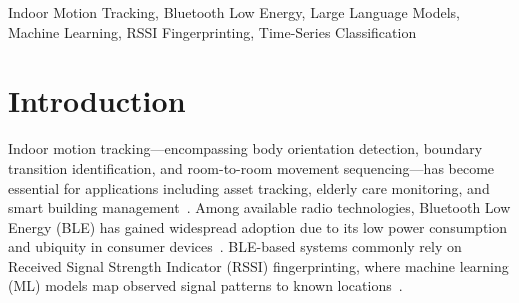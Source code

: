 \documentclass[conference]{IEEEtran}
\begin{document}
\maketitle
\vspace{-12mm}

\begin{abstract}
This paper presents a comparative evaluation of Bluetooth Low Energy (BLE) Received Signal Strength Indicator (RSSI)-based indoor motion tracking using four classifiers: K-Nearest Neighbors (KNN), eXtreme Gradient Boosting (XGBoost), and two zero-shot Large Language Model (LLM) classifiers (Claude Opus 4.6 and Gemini 3.1 Pro). Experiments are conducted in a single room divided into four zones by cloth partitions, instrumented with four ESP32-S3 BLE anchor nodes and one M5StickC Plus2 wearable tag. Three scenarios evaluate body orientation detection, boundary transition classification, and multi-zone trajectory sequencing under inherently unstable BLE signal conditions. Robustness experiments under noise injection and anchor failure reveal that LLMs demonstrate strong resilience to hardware degradation. These findings suggest that zero-shot LLMs can achieve competitive performance compared to trained ML models on structured BLE RSSI classification tasks, particularly when temporal reasoning or clear signal patterns are present.
\end{abstract}

\begin{IEEEkeywords}
Indoor Motion Tracking, Bluetooth Low Energy, Large Language Models, Machine Learning, RSSI Fingerprinting, Time-Series Classification
\end{IEEEkeywords}


\section{Introduction}
Indoor motion tracking---encompassing body orientation detection, boundary transition identification, and room-to-room movement sequencing---has become essential for applications including asset tracking, elderly care monitoring, and smart building management~\cite{b1}. Among available radio technologies, Bluetooth Low Energy (BLE) has gained widespread adoption due to its low power consumption and ubiquity in consumer devices~\cite{b2}. BLE-based systems commonly rely on Received Signal Strength Indicator (RSSI) fingerprinting, where machine learning (ML) models map observed signal patterns to known locations~\cite{b3}.
\end{document}
